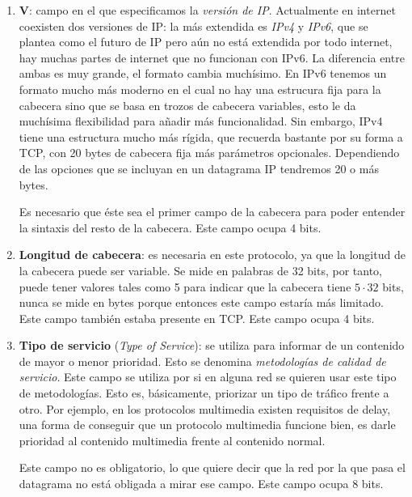 \documentclass[10pt,a4paper,spanish]{report}
\begin{document}
\begin{enumerate}[\color{tema4}{$\heartsuit$}]
  \item \textbf{\textcolor{tema4}{V}}: campo en el que especificamos la \textit{\textcolor{tema4}{versión de IP}}. Actualmente en internet coexisten dos versiones de IP: la más extendida es \textit{\textcolor{tema4}{IPv4}} y \textcolor{tema4}{\textit{IPv6}}, que se plantea como el futuro de IP pero aún no está extendida por todo internet, hay muchas partes de internet que no funcionan con IPv6. La diferencia entre ambas es muy grande, el formato cambia muchísimo. En IPv6 tenemos un formato mucho más moderno en el cual no hay una estrucura fija para la cabecera sino que se basa en trozos de cabecera variables, esto le da muchísima flexibilidad para añadir más funcionalidad. Sin embargo, IPv4 tiene una estructura mucho más rígida, que recuerda bastante por su forma a TCP, con 20 bytes de cabecera fija más parámetros opcionales. Dependiendo de las opciones que se incluyan en un datagrama IP tendremos 20 o más bytes.

  Es necesario que éste sea el primer campo de la cabecera para poder entender la sintaxis del resto de la cabecera. Este campo ocupa 4 bits.

  \item \textbf{\textcolor{tema4}{Longitud de cabecera}}: es necesaria en este protocolo, ya que la longitud de la cabecera puede ser variable. Se mide en palabras de 32 bits, por tanto, puede tener valores tales como 5 para indicar que la cabecera tiene $5 \cdot 32$ bits, nunca se mide en bytes porque entonces este campo estaría más limitado. Este campo también estaba presente en TCP. Este campo ocupa 4 bits.

  \item \textbf{\textcolor{tema4}{Tipo de servicio}} (\textit{\textcolor{tema4}{Type of Service}}): se utiliza para informar de un contenido de mayor o menor prioridad. Esto se denomina \textit{\textcolor{tema4}{metodologías de calidad de servicio}}. Este campo se utiliza por si en alguna red se quieren usar este tipo de metodologías. Esto es, básicamente, priorizar un tipo de tráfico frente a otro. Por ejemplo, en los protocolos multimedia existen requisitos de delay, una forma de conseguir que un protocolo multimedia funcione bien, es darle prioridad al contenido multimedia frente al contenido normal.

  Este campo no es obligatorio, lo que quiere decir que la red por la que pasa el datagrama no está obligada a mirar ese campo. Este campo ocupa 8 bits.


\end{enumerate}
\end{document}

